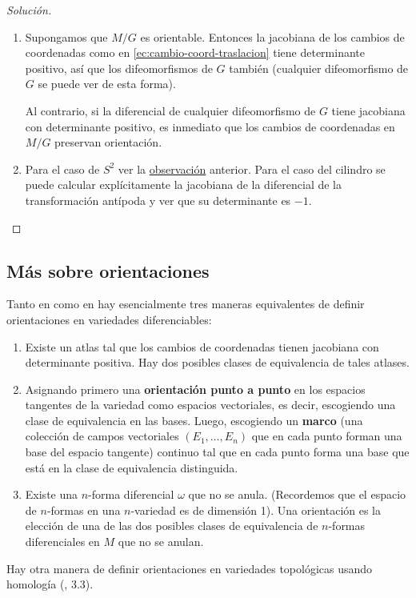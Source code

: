 \documentclass[spanish]{book}
\theoremstyle{definition}
\begin{document}
\begin{proof}[Solución]
\begin{enumerate}
			\item Supongamos que $M/G$ es orientable. Entonces la jacobiana de los cambios de coordenadas como en \ref{ec:cambio-coord-traslacion} tiene determinante positivo, así que los difeomorfismos de $G$ también (cualquier difeomorfismo de $G$ se puede ver de esta forma).
				
			Al contrario, si la diferencial de cualquier difeomorfismo de $G$ tiene jacobiana con determinante positivo, es inmediato que los cambios de coordenadas en $M/G$ preservan orientación.
			
			\item Para el caso de $S^2$ ver la \hyperref[obs:antipoda-orientacion]{observación} anterior. Para el caso del cilindro se puede calcular explícitamente la jacobiana de la diferencial de la transformación antípoda y ver que su determinante es $-1$.
		\end{enumerate}
	\end{proof}
	
	\subsection{Más sobre orientaciones}
	Tanto en \cite{Lee} como en \cite{Loring} hay esencialmente tres maneras equivalentes de definir orientaciones en variedades diferenciables:
	\begin{enumerate}
		\item Existe un atlas tal que los cambios de coordenadas tienen jacobiana con determinante positiva. Hay dos posibles clases de equivalencia de tales atlases.
		\item Asignando primero una \textbf{orientación punto a punto} en los espacios tangentes de la variedad como espacios vectoriales, es decir, escogiendo una clase de equivalencia en las bases. Luego, escogiendo un \textbf{marco} (una colección de campos vectoriales $(E_1,\ldots,E_n)$ que en cada punto forman una base del espacio tangente) continuo tal que en cada punto forma una base que está en la clase de equivalencia distinguida.
		\item Existe una $n$-forma diferencial $\omega$ que no se anula. (Recordemos que el espacio de $n$-formas en una $n$-variedad es de dimensión 1). Una orientación es la elección de una de las dos posibles  clases de equivalencia de $n$-formas diferenciales en $M$ que no se anulan.
	\end{enumerate}
	Hay otra manera de definir orientaciones en variedades topológicas usando homología (\cite{Hatcher}, 3.3).
	
\end{document}
